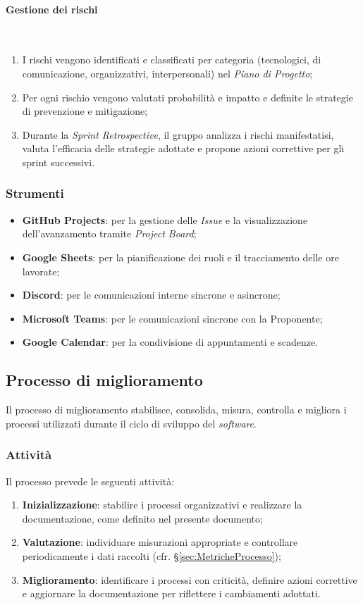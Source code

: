 \documentclass[10pt, letterpaper]{article}
\newcommand{\trisubsection}[1]{\paragraph{#1}\mbox{}\\}
\begin{document}
\trisubsection{Gestione dei rischi}
\begin{enumerate}
    \item I rischi vengono identificati e classificati per categoria (tecnologici, di comunicazione, organizzativi, interpersonali) nel \textit{Piano di Progetto};
    \item Per ogni rischio vengono valutati probabilità e impatto e definite le strategie di prevenzione e mitigazione;
    \item Durante la \textit{Sprint Retrospective}, il gruppo analizza i rischi manifestatisi, valuta l'efficacia delle strategie adottate e propone azioni correttive per gli sprint successivi.
\end{enumerate}

\subsubsection{Strumenti}
\begin{itemize}
    \item \textbf{GitHub Projects}: per la gestione delle \textit{Issue} e la visualizzazione dell'avanzamento tramite \textit{Project Board}; 
    \item \textbf{Google Sheets}: per la pianificazione dei ruoli e il tracciamento delle ore lavorate;
    \item \textbf{Discord}: per le comunicazioni interne sincrone e asincrone;
    \item \textbf{Microsoft Teams}: per le comunicazioni sincrone con la Proponente;
    \item \textbf{Google Calendar}: per la condivisione di appuntamenti e scadenze.
\end{itemize}


\subsection{Processo di miglioramento}
Il processo di miglioramento stabilisce, consolida, misura, controlla e migliora i processi utilizzati durante il ciclo di sviluppo del \textit{software}.

\subsubsection{Attività}
Il processo prevede le seguenti attività:
\begin{enumerate}
    \item \textbf{Inizializzazione}: stabilire i processi organizzativi e realizzare la documentazione, come definito nel presente documento;
    \item \textbf{Valutazione}: individuare misurazioni appropriate e controllare periodicamente i dati raccolti (cfr. §\ref{sec:MetricheProcesso});
    \item \textbf{Miglioramento}: identificare i processi con criticità, definire azioni correttive e aggiornare la documentazione per riflettere i cambiamenti adottati.
\end{enumerate}
\end{document}
